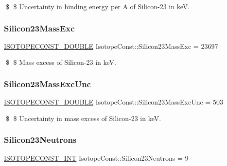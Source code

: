 \$ \$ Uncertainty in binding energy per A of Silicon-\/23 in keV. \mbox{\label{group___isotope_const-_silicon-_si23_gafc8dd06ffe8739e2287a34025cb80b4b}} 
\subsubsection{\texorpdfstring{Silicon23\+Mass\+Exc}{Silicon23MassExc}}
{\footnotesize\ttfamily \mbox{\hyperlink{group___isotope_const-_macros_ga8f45a7272ce02c0b4c65c44636ed719a}{I\+S\+O\+T\+O\+P\+E\+C\+O\+N\+S\+T\+\_\+\+D\+O\+U\+B\+LE}} Isotope\+Const\+::\+Silicon23\+Mass\+Exc = 23697}

\$ \$ Mass excess of Silicon-\/23 in keV. \mbox{\label{group___isotope_const-_silicon-_si23_ga31e4df851291226ec76cec035272f270}} 
\subsubsection{\texorpdfstring{Silicon23\+Mass\+Exc\+Unc}{Silicon23MassExcUnc}}
{\footnotesize\ttfamily \mbox{\hyperlink{group___isotope_const-_macros_ga8f45a7272ce02c0b4c65c44636ed719a}{I\+S\+O\+T\+O\+P\+E\+C\+O\+N\+S\+T\+\_\+\+D\+O\+U\+B\+LE}} Isotope\+Const\+::\+Silicon23\+Mass\+Exc\+Unc = 503}

\$ \$ Uncertainty in mass excess of Silicon-\/23 in keV. \mbox{\label{group___isotope_const-_silicon-_si23_ga26b4b927d730735480f5ef62586975b8}} 
\subsubsection{\texorpdfstring{Silicon23\+Neutrons}{Silicon23Neutrons}}
{\footnotesize\ttfamily \mbox{\hyperlink{group___isotope_const-_macros_ga5f18360b3e99483a35c32d789e62621c}{I\+S\+O\+T\+O\+P\+E\+C\+O\+N\+S\+T\+\_\+\+I\+NT}} Isotope\+Const\+::\+Silicon23\+Neutrons = 9}

